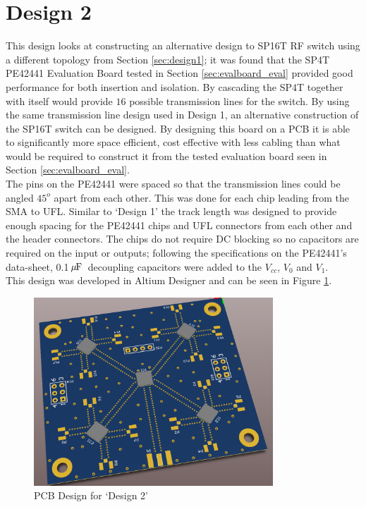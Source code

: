 \documentclass[12pt,openany,a4paper]{book}
\newcommand{\pack}	{\hspace{-0.08em}}
\newcommand{\uF}	{\ensuremath{\rm\,\mu\pack F}}
\begin{document}
\section{Design 2}		\label{sec:design2}
This design looks at constructing an alternative design to SP16T RF switch using a different topology from Section \ref{sec:design1}; it was found that the SP4T PE42441 Evaluation Board tested in Section \ref{sec:evalboard_eval} provided good performance for both insertion and isolation. By cascading the SP4T together with itself would provide $16$ possible transmission lines for the switch. By using the same transmission line design used in Design 1, an alternative construction of the SP16T switch can be designed. By designing this board on a PCB it is able to significantly more space efficient, cost effective with less cabling than what would be required to construct it from the tested evaluation board seen in Section \ref{sec:evalboard_eval}.\\[0.2cm]
The pins on the PE42441 were spaced so that the transmission lines could be angled $45^o$ apart from each other. This was done for each chip leading from the SMA to UFL. Similar to `Design 1' the track length was designed to provide enough spacing for the PE42441 chips and UFL connectors from each other and the header connectors. The chips do not require DC blocking so no capacitors are required on the input or outputs; following the specifications on the PE42441's data-sheet, 0.1\uF \ decoupling capacitors were added to the $V_{cc}$, $V_0$ and $V_1$. 
\\[0.2cm]
This design was developed in Altium Designer and can be seen in Figure \ref{fig:design2}.
\begin{figure}[H]
	\centering
    \includegraphics[width=0.8\textwidth]{design2_pcb.png}
	\caption{PCB Design for `Design 2'}
	\label{fig:design2}
\end{figure} 
\end{document}
